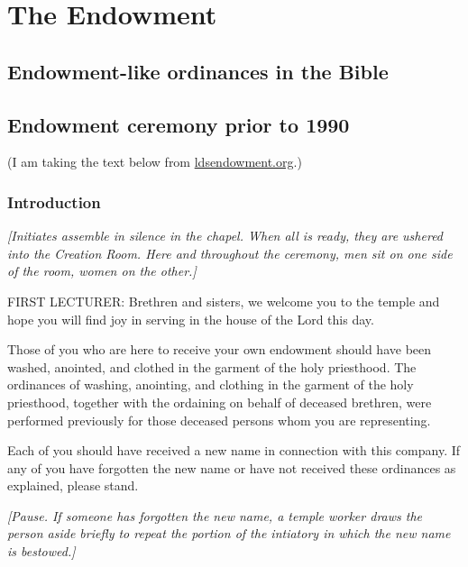 \section{The Endowment}
	\label{TEMPLE-ENDOWMENT-ENDOW}

	\subsection{Endowment-like ordinances in the Bible}
	
		

	\subsection{Endowment ceremony prior to 1990}
		\label{TEMPLE-ENDOWMENT-ENDOW-PRE-1990}
	
		(I am taking the text below from \href{http://www.ldsendowment.org}{ldsendowment.org}.)
	
		\subsubsection{Introduction}
			\label{TEMPLE-ENDOWMENT-ENDOW-PRE-1990-INTRO}
		
			\textit{[Initiates assemble in silence in the chapel. When all is ready, they are ushered into the Creation Room. Here and throughout the ceremony, men sit on one side of the room, women on the other.]}

			FIRST LECTURER: Brethren and sisters, we welcome you to the temple and hope you will find joy in serving in the house of the Lord this day.

			Those of you who are here to receive your own endowment should have been washed, anointed, and clothed in the garment of the holy priesthood. The ordinances of washing, anointing, and clothing in the garment of the holy priesthood, together with the ordaining on behalf of deceased brethren, were performed previously for those deceased persons whom you are representing.

			Each of you should have received a new name in connection with this company. If any of you have forgotten the new name or have not received these ordinances as explained, please stand.

			\textit{[Pause. If someone has forgotten the new name, a temple worker draws the person aside briefly to repeat the portion of the intiatory in which the new name is bestowed.]}

